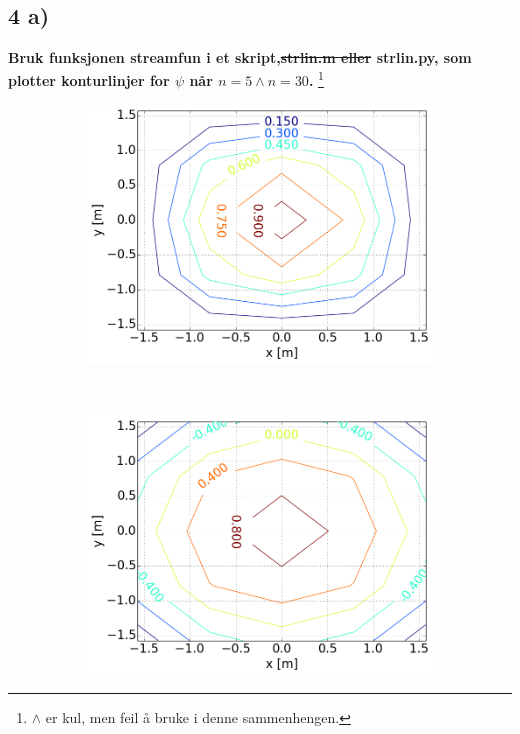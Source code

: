 \subsection*{4 a)}
\textbf{Bruk funksjonen streamfun i et skript,\sout{strlin.m eller} strlin.py,
 som plotter konturlinjer for $\psi$ når $n = 5 \land n =30$.}
 \footnote{$\land$ er kul, men feil å bruke i denne sammenhengen.}

\begin{figure}[H]
    \centering
    \begin{subfigure}{0.3\textwidth}
        \centering
        \includegraphics[width=\linewidth]{../4a_0_0,5_5.png}
        \caption{}
    \end{subfigure}%
    ~
    \begin{subfigure}{0.3\textwidth}
        \centering
        \includegraphics[width=\linewidth]{../4a_1_0,5_5.png}

\end{subfigure}
\end{figure}

